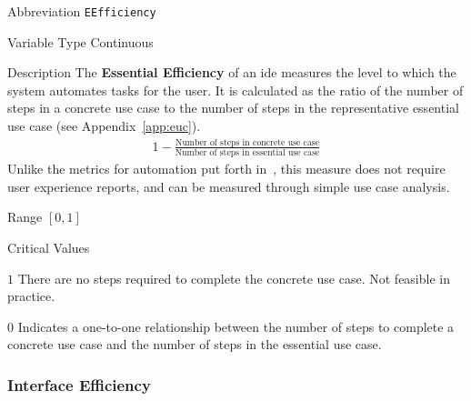 \begin{AlignedDesc}
  \item[Abbreviation] \texttt{EEfficiency}

  \item[Variable Type] Continuous

  \item[Description] The \textbf{Essential Efficiency} of an \ac{ide}
  measures the level to which the system automates tasks for the user. It
  is calculated as the ratio of the number of steps in a concrete use case
  to the number of steps in the representative essential use case (see
  Appendix~\ref{app:euc}).~\cite{constantine1996}
%
  \begin{align*}
    1 - \frac{\text{Number of steps in concrete use case}}
             {\text{Number of steps in essential use case}}
  \end{align*}
%
  Unlike the metrics for automation put forth in~\cite{Wei1998}, this
  measure does not require user experience reports, and can be measured
  through simple use case analysis.

  \item[Range] $[0, 1]$

  \item[Critical Values]
  \begin{AlignedDesc}
    \item[$1$] There are no steps required to complete the concrete use
    case. Not feasible in practice.
    \item[$0$] Indicates a one-to-one relationship between the number of
    steps to complete a concrete use case and the number of steps in the
    essential use case.
  \end{AlignedDesc}

\end{AlignedDesc}

\subsubsection{Interface Efficiency}
\label{subsubsec:iefficiency}

